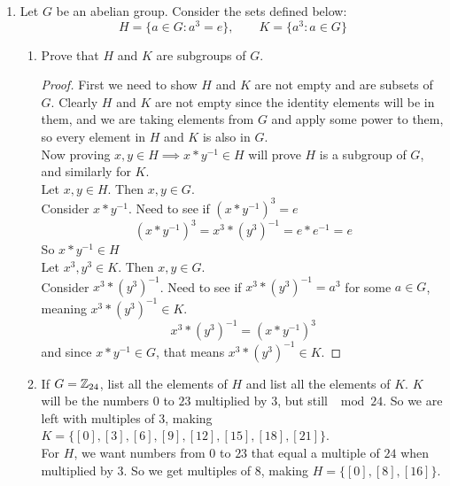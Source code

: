 \documentclass[12pt]{article}
\begin{document}
\begin{enumerate}
		\item Let $G$ be an abelian group. Consider the sets defined below:
		\[H = \{a \in G : a^3 = e\}, \qquad K = \{a^3 : a \in G\}\]
		\begin{enumerate}
			\item Prove that $H$ and $K$ are subgroups of $G$.
			\begin{proof}
				First we need to show $H$ and $K$ are not empty and are subsets of $G$. Clearly $H$ and $K$ are not empty since the identity elements will be in them, and we are taking elements from $G$ and apply some power to them, so every element in $H$ and $K$ is also in $G$.\\
				Now proving $x,y \in H \implies x*y^{-1} \in H$ will prove $H$ is a subgroup of $G$, and similarly for $K$.\\
				Let $x,y \in H$. Then $x,y \in G$.\\
				Consider $x * y^{-1}$. Need to see if $(x * y^{-1})^3 = e$
				\[(x * y^{-1})^3 = x^3 * (y^3)^{-1} = e * e^{-1} = e\]
				So $x * y^{-1} \in H$\\
				Let $x^3,y^3 \in K$. Then $x,y \in G$.\\
				Consider $x^3 * (y^3)^{-1}$. Need to see if $x^3 * (y^3)^{-1} = a^3$ for some $a \in G$, meaning $x^3 * (y^3)^{-1} \in K$.
				\[x^3 * (y^3)^{-1} = (x*y^{-1})^3\]
				and since $x*y^{-1} \in G$, that means $x^3 * (y^3)^{-1} \in K$.
			\end{proof}

			\item If $G = \mathbb{Z}_{24}$, list all the elements of $H$ and list all the elements of $K$.\m
			$K$ will be the numbers $0$ to $23$ multiplied by $3$, but still $\mod24$. So we are left with multiples of 3, making $K = \{[0],[3],[6],[9],[12],[15],[18],[21]\}$.\\
			For $H$, we want numbers from $0$ to $23$ that equal a multiple of $24$ when multiplied by $3$. So we get multiples of $8$, making $H = \{[0],[8],[16]\}$.
		\end{enumerate}
		

\end{enumerate}
\end{document}
